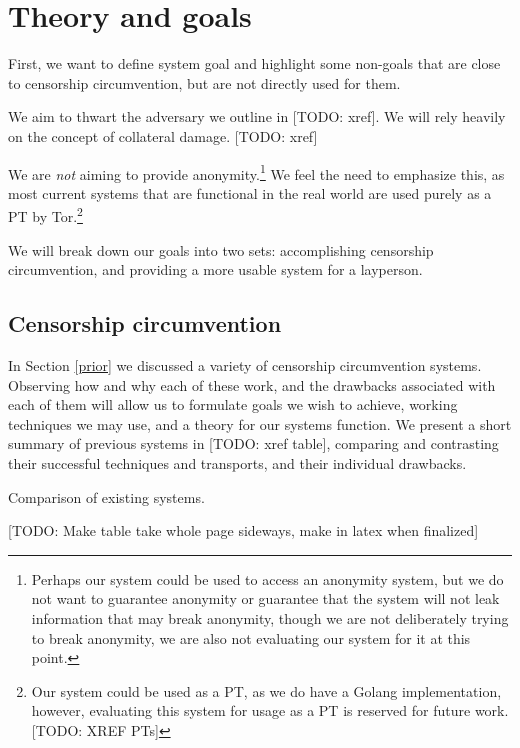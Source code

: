 \documentclass[12pt]{report}
\begin{document}
\section{Theory and goals}

First, we want to define system goal and highlight some non-goals that are close to censorship circumvention, but are not directly used for them.

We aim to thwart the adversary we outline in [TODO: xref]. We will rely heavily on the concept of collateral damage. [TODO: xref]

We are \emph{not} aiming to provide anonymity.\footnote{Perhaps our system could be used to access an anonymity system, but we do not want to guarantee anonymity or guarantee that the system will not leak information that may break anonymity, though we are not deliberately trying to break anonymity, we are also not evaluating our system for it at this point.} We feel the need to emphasize this, as most current systems that are functional in the real world are used purely as a PT by Tor.\footnote{Our system could be used as a PT, as we do have a Golang implementation, however, evaluating this system for usage as a PT is reserved for future work. [TODO: XREF PTs]}

We will break down our goals into two sets: accomplishing censorship circumvention, and providing a more usable system for a layperson.

\subsection{Censorship circumvention}

In Section \ref{prior} we discussed a variety of censorship circumvention systems. Observing how and why each of these work, and the drawbacks associated with each of them will allow us to formulate goals we wish to achieve, working techniques we may use, and a theory for our systems function. We present a short summary of previous systems in [TODO: xref table], comparing and contrasting their successful techniques and transports, and their individual drawbacks.

\begin{table}
\caption{Comparison of existing systems.}
\begin{center}
[TODO: Make table take whole page sideways, make in latex when finalized]
\end{center}
\end{table}
\end{document}
